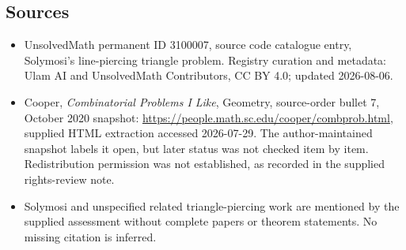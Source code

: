 \documentclass[11pt]{article}
\begin{document}
\subsection{Sources}
\begin{itemize}
\item UnsolvedMath permanent ID 3100007, source code catalogue entry, Solymosi's line-piercing triangle problem. Registry curation and metadata: Ulam AI and UnsolvedMath Contributors, CC BY 4.0; updated 2026-08-06.
\item Cooper, \emph{Combinatorial Problems I Like}, Geometry, source-order bullet 7, October 2020 snapshot: \url{https://people.math.sc.edu/cooper/combprob.html}, supplied HTML extraction accessed 2026-07-29. The author-maintained snapshot labels it open, but later status was not checked item by item. Redistribution permission was not established, as recorded in the supplied rights-review note.
\item Solymosi and unspecified related triangle-piercing work are mentioned by the supplied assessment without complete papers or theorem statements. No missing citation is inferred.
\end{itemize}
\end{document}
